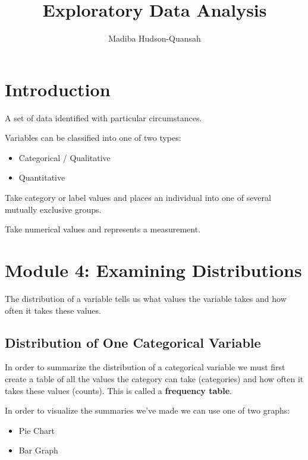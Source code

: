 \documentclass[12pt letter]{report}
\title{\Huge{Exploratory Data Analysis}}
\author{\huge{Madiba Hudson-Quansah}}
\date{}
\begin{document}
\maketitle
\newpage
{}
\tableofcontents
\pagebreak

\chapter{Introduction}


 {
	A set of data identified with particular circumstances.
}

Variables can be classified into one of two types:

\begin{itemize}
	\item Categorical / Qualitative
	\item Quantitative
\end{itemize}

 {
	Take category or label values and places an individual into one of several mutually exclusive groups.
}

 {
	Take numerical values and represents a measurement.
}

\chapter{Module 4: Examining Distributions}

 {
	The distribution of a variable tells us what values the variable takes and how often it takes these values.
}

\section{Distribution of One Categorical Variable}

In order to summarize the distribution of a categorical variable we must first create a table of all the values the
category can take (categories) and how often it takes these values (counts). This is called a \textbf{frequency table}.


In order to visualize the summaries we've made we can use one of two graphs:

\begin{itemize}
	\item Pie Chart
	\item Bar Graph
\end{itemize}
\end{document}
